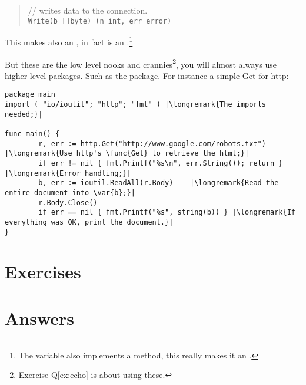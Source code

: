 \begin{quote}
//  writes data to the connection.\\
\lstinline{Write(b []byte) (n int, err error)}
\end{quote}
This makes  also an , in fact  is an
.\footnote{The variable  also implements a  method, this really makes
it an .}

But these are the low level nooks and crannies\footnote{Exercise Q\ref{ex:echo} is about using
these.}, you will almost always use higher level packages.
Such as the  package. For instance a simple Get for http:
\begin{lstlisting}
package main
import ( "io/ioutil"; "http"; "fmt" ) |\longremark{The imports needed;}|

func main() {
        r, err := http.Get("http://www.google.com/robots.txt") |\longremark{Use http's \func{Get} to retrieve the html;}|
        if err != nil { fmt.Printf("%s\n", err.String()); return } |\longremark{Error handling;}|
        b, err := ioutil.ReadAll(r.Body)    |\longremark{Read the entire document into \var{b};}|
        r.Body.Close()  
        if err == nil { fmt.Printf("%s", string(b)) } |\longremark{If everything was OK, print the document.}|
}
\end{lstlisting}
\showremarks

\section{Exercises}














\cleardoublepage
\section{Answers}
\shipoutAnswer
